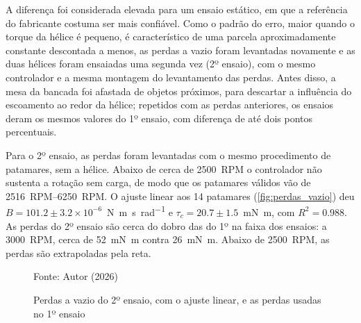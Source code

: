 A diferença foi considerada elevada para um ensaio estático, em que a
referência do fabricante costuma ser mais confiável. Como o padrão do erro,
maior quando o torque da hélice é pequeno, é característico de uma parcela
aproximadamente constante descontada a menos, as perdas a vazio foram
levantadas novamente e as duas hélices foram ensaiadas uma segunda vez (2º
ensaio), com o mesmo controlador e a mesma montagem do levantamento das
perdas. Antes disso, a mesa da
bancada foi afastada de objetos próximos, para descartar a influência do
escoamento ao redor da hélice; repetidos com as perdas anteriores, os ensaios
deram os mesmos valores do 1º ensaio, com diferença de até dois pontos
percentuais.

Para o 2º ensaio, as perdas foram levantadas com o mesmo procedimento de
patamares, sem a hélice. Abaixo de cerca de \SI{2500}{RPM} o controlador não
sustenta a rotação sem carga, de modo que os patamares válidos vão de
\SIrange{2516}{6250}{RPM}. O ajuste linear aos \num{14} patamares
(\autoref{fig:perdas_vazio}) deu $B = \num{101,2} \pm \num{3,2} \times 10^{-6}$~\si{\newton\meter\second\per\radian}
e $\tau_c = \num{20,7} \pm \num{1,5}$~\si{\milli\newton\meter}, com $R^2 = \num{0,988}$.
As perdas do 2º ensaio são cerca do dobro das do 1º na faixa dos ensaios: a
\SI{3000}{RPM}, cerca de \SI{52}{\milli\newton\meter} contra
\SI{26}{\milli\newton\meter}. Abaixo de \SI{2500}{RPM}, as perdas são
extrapoladas pela reta.

\begin{figure}[H]
    \centering
    \caption{Perdas a vazio do 2º ensaio, com o ajuste linear, e as perdas usadas no 1º ensaio}
    \label{fig:perdas_vazio}

    Fonte: Autor (2026)
\end{figure}

